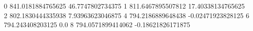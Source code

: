 0 841.0181884765625 46.7747802734375
1 811.6467895507812 17.40338134765625
2 802.1830444335938 7.93963623046875
4 794.2186889648438 -0.02471923828125
6 794.243408203125 0.0
8 794.0571899414062 -0.18621826171875
